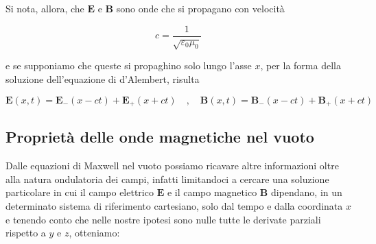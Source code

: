 Si nota, allora, che $\mathbf{E}$ e $\mathbf{B}$ sono onde che si propagano con velocità 

\begin{tcolorbox}[colback=yellow!10!white, colframe=orange!70!black, boxrule=0.8pt]
\begin{equation}
    c = \frac{1}{\sqrt{\varepsilon_0 \mu_0}}
\end{equation}
\end{tcolorbox}

e se supponiamo che queste si propaghino solo lungo l'asse $x$, per la forma della soluzione dell'equazione di d'Alembert, risulta

\begin{tcolorbox}[colback=yellow!10!white, colframe=orange!70!black, boxrule=0.8pt]
\begin{equation} \label{eq: soluzione_eq_onde_elettromagnetiche}
    \mathbf{E}(x,t) = \mathbf{E}_{-} (x - ct) + \mathbf{E}_{+} (x + ct) \quad , \quad \mathbf{B}(x,t) = \mathbf{B}_{-} (x - ct) + \mathbf{B}_{+} (x + ct)
\end{equation}
\end{tcolorbox}

\subsection{Proprietà delle onde magnetiche nel vuoto}

Dalle equazioni di Maxwell nel vuoto possiamo ricavare altre informazioni oltre alla natura ondulatoria dei campi, infatti limitandoci a cercare una soluzione particolare in cui il campo elettrico $\mathbf{E}$ e il campo magnetico $\mathbf{B}$ dipendano, in un determinato sistema di riferimento cartesiano, solo dal tempo e dalla coordinata $x$ e tenendo conto che nelle nostre ipotesi sono nulle tutte le derivate parziali rispetto a $y$ e $z$, otteniamo:

